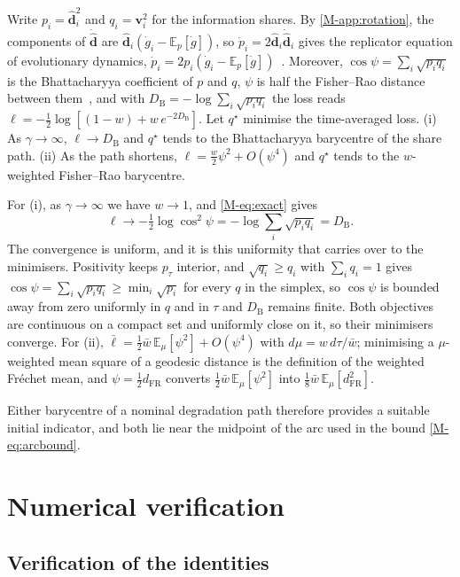 \documentclass[12pt]{article}
\newcommand{\E}{\mathbb{E}}
\newcommand{\dhat}{\hat{\mathbf{d}}}
\newcommand{\dFR}{d_{\mathrm{FR}}}
\newcommand{\DB}{D_{\mathrm{B}}}
\newcommand{\lloss}{\ell}
\begin{document}
Write $p_i=\dhat_i^{2}$ and $q_i=\mathbf v_i^{2}$ for the information shares.
By \ref{M-app:rotation}, the components of $\dot{\dhat}$ are
$\dhat_i(\dot g_i-\E_p[\dot g])$, so $\dot p_i=2\dhat_i\dot{\dhat}_i$ gives the
replicator equation of evolutionary dynamics,
$\dot p_i=2p_i(\dot g_i-\E_p[\dot g])$~\cite{hofbauer1998}. Moreover,
$\cos\psi=\sum_i\sqrt{p_iq_i}$ is the Bhattacharyya coefficient of $p$
and $q$, $\psi$ is half the Fisher--Rao distance between
them~\cite{amari2016}, and with
$\DB=-\log\sum_i\sqrt{p_iq_i}$ the loss reads
$\lloss=-\tfrac12\log[(1-w)+w\,e^{-2\DB}]$. Let $q^{\star}$ minimise the
time-averaged loss. (i) As $\gamma\to\infty$, $\lloss\to\DB$ and $q^{\star}$
tends to the Bhattacharyya barycentre of the share path. (ii) As the path
shortens, $\lloss=\tfrac{w}{2}\psi^{2}+O(\psi^{4})$ and $q^{\star}$ tends to
the $w$-weighted Fisher--Rao barycentre.

For (i), as $\gamma\to\infty$ we have $w\to1$, and \eqref{M-eq:exact} gives
\[
\lloss\to-\tfrac12\log\cos^{2}\psi=-\log\sum_i\sqrt{p_iq_i}=\DB .
\]
The convergence is uniform, and it is this uniformity that carries over to
the minimisers. Positivity keeps $p_\tau$ interior, and $\sqrt{q_i}\ge q_i$
with $\sum_iq_i=1$ gives $\cos\psi=\sum_i\sqrt{p_iq_i}\ge\min_i\sqrt{p_i}$ for
every $q$ in the simplex, so $\cos\psi$ is bounded away from zero uniformly in
$q$ and in $\tau$ and $\DB$ remains finite. Both objectives are continuous on
a compact set and uniformly close on it, so their minimisers converge. For
(ii), $\bar\lloss=\tfrac12\bar w\,\E_\mu[\psi^{2}]+O(\psi^{4})$ with
$d\mu=w\,d\tau/\bar w$; minimising a $\mu$-weighted mean square of a geodesic
distance is the definition of the weighted Fr\'echet mean, and
$\psi=\tfrac12\dFR$ converts $\tfrac12\bar w\,\E_\mu[\psi^{2}]$ into
$\tfrac18\bar w\,\E_\mu[\dFR^{2}]$.

Either barycentre of a nominal degradation path therefore provides a
suitable initial indicator, and both lie near the midpoint of the arc used in
the bound \eqref{M-eq:arcbound}.

\section{Numerical verification}
\label{sec:verification}

\subsection{Verification of the identities}
\end{document}
